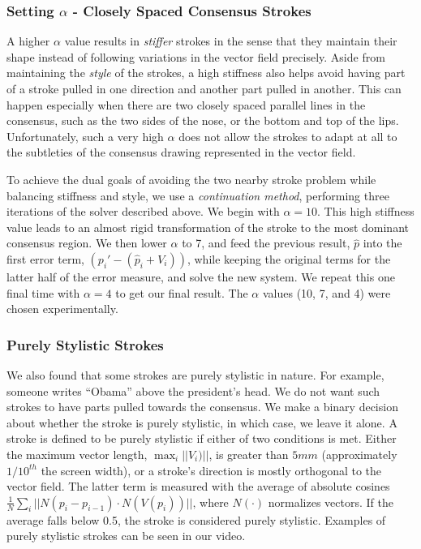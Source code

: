 \subsubsection{Setting $\alpha$ - Closely Spaced Consensus Strokes}

A higher $\alpha$ value results in {\em stiffer} strokes in the sense that they maintain their shape instead of following variations in the vector field precisely. Aside from maintaining the {\em style} of the strokes, a high stiffness also helps avoid having part of a stroke pulled in one direction and another part pulled in another. This can happen especially when there are two closely spaced parallel lines in the consensus, such as the two sides of the nose, or the bottom and top of the lips. Unfortunately, such a very high $\alpha$ does not allow the strokes to adapt at all to the subtleties of the consensus drawing represented in the vector field.

To achieve the dual goals of avoiding the two nearby stroke problem while balancing stiffness and style, we use a {\em continuation method}, performing three iterations of the solver described above. We begin with $\alpha=10$. This high stiffness value leads to an almost rigid transformation of the stroke to the most dominant consensus region. We then lower $\alpha$ to 7, and feed the previous result, $\hat{p}$ into the first error term, $(p_i' - (\hat{p}_i + V_i))$, while keeping the original terms for the latter half of the error measure, and solve the new system. We repeat this one final time with $\alpha=4$ to get our final result. The $\alpha$ values (10, 7, and 4) were chosen experimentally.

\subsubsection{Purely Stylistic Strokes}

We also found that some strokes are purely stylistic in nature. For example, someone writes ``Obama'' above the president's head. We do not want such strokes to have parts pulled towards the consensus. We make a binary decision about whether the stroke is purely stylistic, in which case, we leave it alone. A stroke is defined to be purely stylistic if either of two conditions is met. Either the maximum vector length, $\max_i||V_i)||$, is greater than $5mm$ (approximately $1/10^{th}$ the screen width), or a stroke's direction is mostly orthogonal to the vector field. The latter term is measured with the average of absolute cosines $\frac{1}{N}\sum_i||N(p_i - p_{i-1}) \cdot N(V(p_i))||\textrm{,}$ where $N(\cdot)$ normalizes vectors. If the average falls below 0.5, the stroke is considered purely stylistic. Examples of purely stylistic strokes can be seen in our video.





